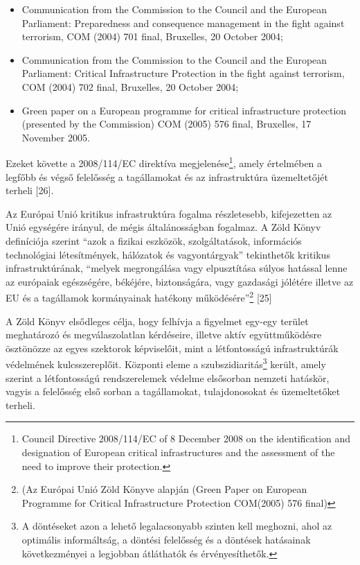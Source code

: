 \documentclass[12pt,magyar,a4paper,oneside]{scrreprt}
\providecommand{\tightlist}{%
  \setlength{\itemsep}{0pt}\setlength{\parskip}{0pt}}
\begin{document}
\begin{itemize}
\tightlist
\item
  Communication from the Commission to the Council and the European
  Parliament: Preparedness and consequence management in the fight
  against terrorism, COM (2004) 701 final, Bruxelles, 20 October 2004;
\item
  Communication from the Commission to the Council and the European
  Parliament: Critical Infrastructure Protection in the fight against
  terrorism, COM (2004) 702 final, Bruxelles, 20 October 2004;
\item
  Green paper on a European programme for critical infrastructure
  protection (presented by the Commission) COM (2005) 576 final,
  Bruxelles, 17 November 2005.
\end{itemize}

Ezeket követte a 2008/114/EC direktíva megjelenése\footnote{Council
  Directive 2008/114/EC of 8 December 2008 on the identification and
  designation of European critical infrastructures and the assessment of
  the need to improve their protection.}, amely értelmében a legfőbb és
végső felelősség a tagállamokat és az infrastruktúra üzemeltetőjét
terheli {[}26{]}.

Az Európai Unió kritikus infrastruktúra fogalma részletesebb,
kifejezetten az Unió egységére irányul, de mégis általánosságban
fogalmaz. A Zöld Könyv definíciója szerint ``azok a fizikai eszközök,
szolgáltatások, információs technológiai létesítmények, hálózatok és
vagyontárgyak'' tekinthetők kritikus infrastruktúrának, ``melyek
megrongálása vagy elpusztítása súlyos hatással lenne az európaiak
egészségére, békéjére, biztonságára, vagy gazdasági jólétére illetve az
EU és a tagállamok kormányainak hatékony működésére''\footnote{(Az
  Európai Unió Zöld Könyve alapján (Green Paper on European Programme
  for Critical Infrastructure Protection COM(2005) 576 final)} {[}25{]}

A Zöld Könyv elsődleges célja, hogy felhívja a figyelmet egy-egy terület
meghatározó és megválaszolatlan kérdéseire, illetve aktív
együttműködésre ösztönözze az egyes szektorok képviselőit, mint a
létfontosságú infrastruktúrák védelmének kulcsszereplőit. Központi eleme
a szubszidiaritás\footnote{A döntéseket azon a lehető legalacsonyabb
  szinten kell meghozni, ahol az optimális informáltság, a döntési
  felelősség és a döntések hatásainak következményei a legjobban
  átláthatók és érvényesíthetők.} került, amely szerint a létfontosságú
rendszerelemek védelme elsősorban nemzeti hatáskör, vagyis a felelősség
első sorban a tagállamokat, tulajdonosokat és üzemeltetőket terheli.
\end{document}
